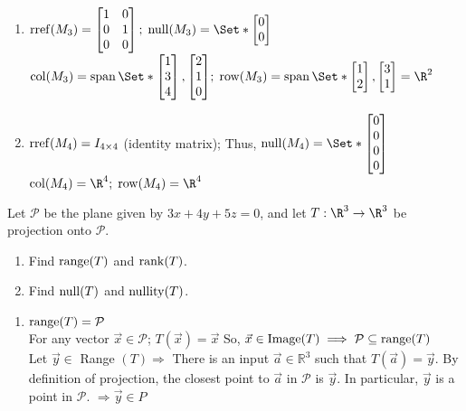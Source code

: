 \begin{exercises}
\begin{problist}
\begin{solution}
\begin{enumerate}
    		    \item $\rref(M_3)=\mat{1&0\\0&1\\0&0};\; \Null(M_3)=\Set*{\mat{0\\0}}$\newline
    		    $\Col(M_3)=\Span\Set*{\mat{1\\3\\4},\mat{2\\1\\0}};\; \Row(M_3)=\Span\Set*{\mat{1\\2},\mat{3\\1}}=\R^2$
    		    
    		    \item $\operatorname{rref}(M_4)=I_{4\times4}$ (identity matrix); Thus, $\Null(M_4)=\Set*{\mat{0\\0\\0\\0}}$\newline
    		    $\Col(M_4)=\R^4; \; \Row(M_4)=\R^4$
		    \end{enumerate}
		\end{solution}

		\prob Let $\mathcal P$ be the plane given by $3x+4y+5z=0$, and
		let $T:\R^{3}\to\R^{3}$ be projection onto $\mathcal P$.
		\begin{enumerate}
			\item Find $\operatorname{range}(T)$ and $\operatorname{rank}(T)$.

			\item Find $\operatorname{null}(T)$ and $\operatorname{nullity}(T)$.
		\end{enumerate}

        \begin{solution}
            \begin{enumerate}
                 \item $\operatorname{range}(T)=\mathcal{P}$\\
    		    For any vector $\vec x \in \mathcal{P}$; $T(\vec x) = \vec x$ 
    		    So, $\vec x\in \text{Image}(T) \implies \mathcal{P} \subseteq \operatorname{range}(T)$\\
    		    
    		    Let \(\vec{y} \in\) Range \((T) \Rightarrow\) There is an input \(\vec{a} \in \mathbb{R}^{3}\) such that \(T(\vec{a})=\vec{y}\).
                By definition of projection, the closest point to \(\vec{a}\) in \(\mathcal{P}\) is \(\vec{y}\).
                In particular, \(\vec{y}\) is a point in \(\mathcal{P}\). \(\Rightarrow \vec{y} \in P\)\\
                

\end{enumerate}
\end{solution}
\end{problist}
\end{exercises}
